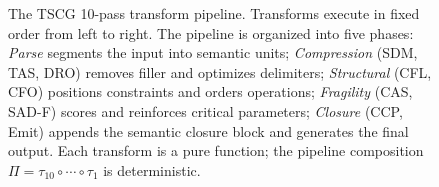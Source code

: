 \begin{figure}[t]
\caption{The TSCG 10-pass transform pipeline. Transforms execute in fixed order from left to right. The pipeline is organized into five phases: \emph{Parse} segments the input into semantic units; \emph{Compression} (SDM, TAS, DRO) removes filler and optimizes delimiters; \emph{Structural} (CFL, CFO) positions constraints and orders operations; \emph{Fragility} (CAS, SAD-F) scores and reinforces critical parameters; \emph{Closure} (CCP, Emit) appends the semantic closure block and generates the final output. Each transform is a pure function; the pipeline composition $\Pi = \tau_{10} \circ \cdots \circ \tau_1$ is deterministic.}
\label{fig:pipeline}
\end{figure}

